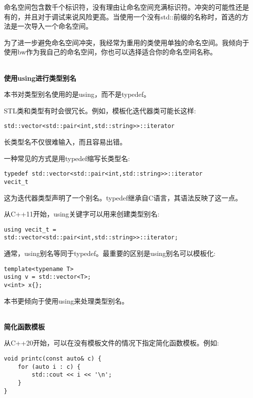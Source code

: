 命名空间包含数千个标识符，没有理由让命名空间充满标识符。冲突的可能性还是有的，并且对于调试来说风险更高。当使用一个没有std::前缀的名称时，首选的方法是一次导入一个命名空间。

为了进一步避免命名空间冲突，我经常为重用的类使用单独的命名空间。我倾向于使用bw作为我自己的命名空间，你也可以选择适合你的命名空间名称。

\hspace*{\fill} \\ %
\noindent
\textbf{使用using进行类型别名}

本书对类型别名使用的是using，而不是typedef。

STL类和类型有时会很冗长。例如，模板化迭代器类可能长这样:

\begin{lstlisting}[style=styleCXX]
std::vector<std::pair<int,std::string>>::iterator
\end{lstlisting}

长类型名不仅很难输入，而且容易出错。

一种常见的方式是用typedef缩写长类型名:

\begin{lstlisting}[style=styleCXX]
typedef std::vector<std::pair<int,std::string>>::iterator
vecit_t
\end{lstlisting}

这为迭代器类型声明了一个别名。typedef继承自C语言，其语法反映了这一点。

从C++11开始，using关键字可以用来创建类型别名:

\begin{lstlisting}[style=styleCXX]
using vecit_t =
std::vector<std::pair<int,std::string>>::iterator;
\end{lstlisting}

通常，using别名等同于typedef。最重要的区别是using别名可以模板化:

\begin{lstlisting}[style=styleCXX]
template<typename T>
using v = std::vector<T>;
v<int> x{};
\end{lstlisting}

本书更倾向于使用using来处理类型别名。

\hspace*{\fill} \\ %
\noindent
\textbf{简化函数模板}

从C++20开始，可以在没有模板文件的情况下指定简化函数模板。例如:

\begin{lstlisting}[style=styleCXX]
void printc(const auto& c) {
	for (auto i : c) {
		std::cout << i << '\n';
	}
}
\end{lstlisting}

